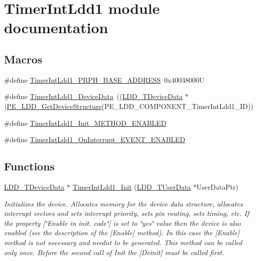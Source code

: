 \hypertarget{group___timer_int_ldd1__module}{}\section{Timer\+Int\+Ldd1 module documentation}
\label{group___timer_int_ldd1__module}
\subsection*{Macros}
\begin{DoxyCompactItemize}
\item 
\#define \hyperlink{group___timer_int_ldd1__module_gafb6b69926d7c31c7571ad3d945251067}{Timer\+Int\+Ldd1\+\_\+\+P\+R\+P\+H\+\_\+\+B\+A\+S\+E\+\_\+\+A\+D\+D\+R\+E\+SS}~0x40038000U
\item 
\#define \hyperlink{group___timer_int_ldd1__module_ga5029b1a3ee62b1e77252cb5ee432e572}{Timer\+Int\+Ldd1\+\_\+\+Device\+Data}~((\hyperlink{group___p_e___types__module_gac5cf1362f1f0e3a2ce71b1bf2276d091}{L\+D\+D\+\_\+\+T\+Device\+Data} $\ast$)\hyperlink{group___p_e___types__module_gaa1c23d559daef5bcd3327ca83fb56f5a}{P\+E\+\_\+\+L\+D\+D\+\_\+\+Get\+Device\+Structure}(P\+E\+\_\+\+L\+D\+D\+\_\+\+C\+O\+M\+P\+O\+N\+E\+N\+T\+\_\+\+Timer\+Int\+Ldd1\+\_\+\+ID))
\item 
\#define \hyperlink{group___timer_int_ldd1__module_ga99f1a84b931818260bb4dfad5d071136}{Timer\+Int\+Ldd1\+\_\+\+Init\+\_\+\+M\+E\+T\+H\+O\+D\+\_\+\+E\+N\+A\+B\+L\+ED}
\item 
\#define \hyperlink{group___timer_int_ldd1__module_ga97ee83f24ca8c5f570d5be8bdc0c6dde}{Timer\+Int\+Ldd1\+\_\+\+On\+Interrupt\+\_\+\+E\+V\+E\+N\+T\+\_\+\+E\+N\+A\+B\+L\+ED}
\end{DoxyCompactItemize}
\subsection*{Functions}
\begin{DoxyCompactItemize}
\item 
\hyperlink{group___p_e___types__module_gac5cf1362f1f0e3a2ce71b1bf2276d091}{L\+D\+D\+\_\+\+T\+Device\+Data} $\ast$ \hyperlink{group___timer_int_ldd1__module_ga069f7459fc74e21fb9bcceadbe7cb9cb}{Timer\+Int\+Ldd1\+\_\+\+Init} (\hyperlink{group___p_e___types__module_ga0b66a73f87238a782318aa0be7578e35}{L\+D\+D\+\_\+\+T\+User\+Data} $\ast$User\+Data\+Ptr)
\begin{DoxyCompactList}\small\item\em Initializes the device. Allocates memory for the device data structure, allocates interrupt vectors and sets interrupt priority, sets pin routing, sets timing, etc. If the property \mbox{[}\char`\"{}\+Enable in init. code\char`\"{}\mbox{]} is set to \char`\"{}yes\char`\"{} value then the device is also enabled (see the description of the \mbox{[}Enable\mbox{]} method). In this case the \mbox{[}Enable\mbox{]} method is not necessary and needn\textquotesingle{}t to be generated. This method can be called only once. Before the second call of Init the \mbox{[}Deinit\mbox{]} must be called first. \end{DoxyCompactList}\end{DoxyCompactItemize}


